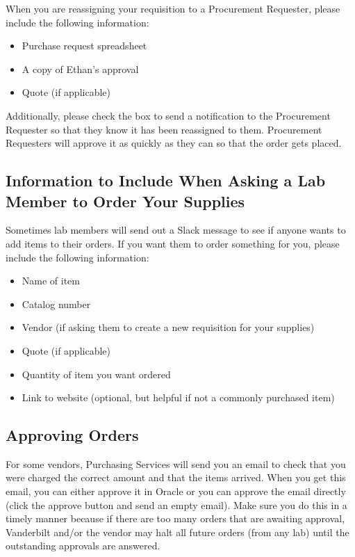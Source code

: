 \documentclass[
]{book}
\begin{document}
When you are reassigning your requisition to a Procurement Requester, please include the following information:

\begin{itemize}
\item
  Purchase request spreadsheet
\item
  A copy of Ethan's approval
\item
  Quote (if applicable)
\end{itemize}

Additionally, please check the box to send a notification to the Procurement Requester so that they know it has been reassigned to them. Procurement Requesters will approve it as quickly as they can so that the order gets placed.

\hypertarget{information-to-include-when-asking-a-lab-member-to-order-your-supplies}{%
\subsection{Information to Include When Asking a Lab Member to Order Your Supplies}\label{information-to-include-when-asking-a-lab-member-to-order-your-supplies}}

Sometimes lab members will send out a Slack message to see if anyone wants to add items to their orders. If you want them to order something for you, please include the following information:

\begin{itemize}
\item
  Name of item
\item
  Catalog number
\item
  Vendor (if asking them to create a new requisition for your supplies)
\item
  Quote (if applicable)
\item
  Quantity of item you want ordered
\item
  Link to website (optional, but helpful if not a commonly purchased item)
\end{itemize}

\hypertarget{approving-orders}{%
\subsection{Approving Orders}\label{approving-orders}}

For some vendors, Purchasing Services will send you an email to check that you were charged the correct amount and that the items arrived. When you get this email, you can either approve it in Oracle or you can approve the email directly (click the approve button and send an empty email). Make sure you do this in a timely manner because if there are too many orders that are awaiting approval, Vanderbilt and/or the vendor may halt all future orders (from any lab) until the outstanding approvals are answered.
\end{document}
